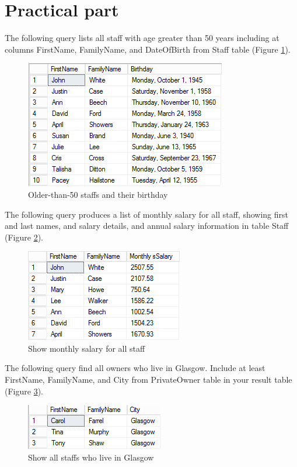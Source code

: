 \documentclass[10pt,a4paper]{article}
\begin{document}
\section{Practical part}
The following query lists all staff with age greater than 50 years including at columns FirstName, FamilyName, and DateOfBirth from Staff table (Figure \ref{1-50years}).

\begin{figure}[hbtp] 
	\centering
	\includegraphics[scale=1]{1-50years.PNG}
	\caption{Older-than-50 staffs and their birthday}
	\label{1-50years}
	\end{figure}
The following query produces a list of monthly salary for all staff, showing first and last names, and salary details, and annual salary information in table Staff (Figure \ref{2-Salary}).

\begin{figure}[hbtp]
	\centering
	\includegraphics[scale=1]{2-Salary.PNG}
	\caption{Show monthly salary for all staff}
	\label{2-Salary}
	\end{figure}
The following query find all owners who live in Glasgow. Include at least FirstName, FamilyName, and City from PrivateOwner table in your result table (Figure \ref{3-Glasgow}).

\begin{figure}[hbtp]
	\centering
	\includegraphics[scale=1]{3-Glasgow.PNG}
	\caption{Show all staffs who live in Glasgow}
	\label{3-Glasgow}
	\end{figure}
\end{document}

